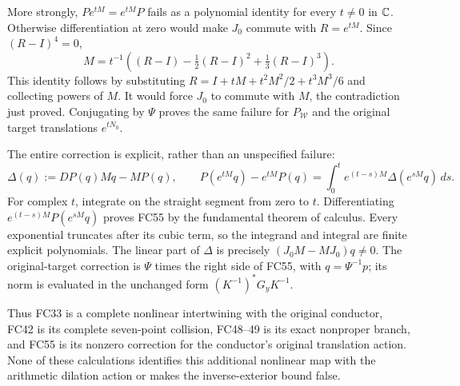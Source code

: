 More strongly, $P e^{tM}=e^{tM}P$ fails as a polynomial identity
for every $t\ne0$ in $\mathbb C$. Otherwise differentiation at zero
would make $J_0$ commute with $R=e^{tM}$. Since $(R-I)^4=0$,
\[
 M=t^{-1}\left((R-I)-\tfrac12(R-I)^2+\tfrac13(R-I)^3\right).
\]
This identity follows by substituting
$R=I+tM+t^2M^2/2+t^3M^3/6$ and collecting powers of $M$.
It would force $J_0$ to commute with $M$, the contradiction just
proved. Conjugating by $\Psi$ proves the same failure for
$P_{\mathcal W}$ and the original target translations $e^{tN_0}$.

The entire correction is explicit, rather than an unspecified failure:
\[
 \Delta(q):=DP(q)Mq-MP(q),\qquad
 P(e^{tM}q)-e^{tM}P(q)
 =\int_0^t e^{(t-s)M}\Delta(e^{sM}q)\,ds.
 \tag{FC55}
\]
For complex $t$, integrate on the straight segment from zero to $t$.
Differentiating $e^{(t-s)M}P(e^{sM}q)$ proves FC55 by the
fundamental theorem of calculus. Every exponential truncates after
its cubic term, so the integrand and integral are finite explicit
polynomials. The linear part of $\Delta$ is precisely
$(J_0M-MJ_0)q\ne0$. The original-target correction is
$\Psi$ times the right side of FC55, with $q=\Psi^{-1}p$;
its norm is evaluated in the unchanged form
$(K^{-1})^*G_yK^{-1}$.

Thus FC33 is a complete nonlinear intertwining with the original
conductor, FC42 is its complete seven-point collision, FC48--49
is its exact nonproper branch, and FC55 is its nonzero correction
for the conductor's original translation action. None of these
calculations identifies this additional nonlinear map with the
arithmetic dilation action or makes the inverse-exterior bound false.


